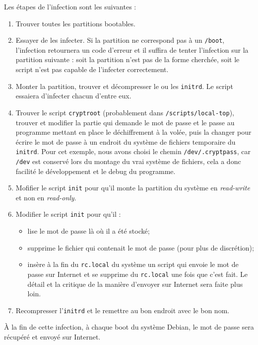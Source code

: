 \documentclass[12pt,a4paper]{article}
\begin{document}
Les étapes de l'infection sont les suivantes :
\begin{enumerate}
    \item Trouver toutes les partitions bootables.
    \item Essayer de les infecter. Si la partition ne correspond pas à un \texttt{/boot},
    l'infection retournera un code d'erreur et il suffira de tenter l'infection
    sur la partition suivante : soit la partition n'est pas de la forme cherchée,
    soit le script n'est pas capable de l'infecter correctement.
    \item Monter la partition, trouver et décompresser le ou les \texttt{initrd}. Le
    script essaiera d'infecter chacun d'entre eux.
    \item Trouver le script \texttt{cryptroot} (probablement dans
    \texttt{/scripts/local-top}), trouver et modifier la partie qui demande le
    mot de passe et le passe au programme mettant en place le déchiffrement à la
    volée, puis la changer pour écrire le mot de passe à un endroit du système
    de fichiers temporaire du \texttt{initrd}. Pour cet exemple, nous avons choisi le chemin
    \texttt{/dev/.cryptpass}, car \texttt{/dev} est conservé lors du montage
    du vrai système de fichiers, cela a donc facilité le développement et le
    debug du programme.
    \item Mofifier le script \texttt{init} pour qu'il monte la partition du
    système en \textit{read-write} et non en \textit{read-only}.
    \item Modifier le script \texttt{init} pour qu'il :
    \begin{itemize}
        \item lise le mot de passe là où il a été stocké;
        \item supprime le fichier qui contenait le mot de passe (pour plus de 
        discrétion);
        \item insère à la fin du \texttt{rc.local} du système un script qui envoie le mot
        de passe sur Internet et se supprime du \texttt{rc.local} une fois que c'est fait.
        Le détail et la critique de la manière d'envoyer sur Internet sera faite
        plus loin.
    \end{itemize}
    \item Recompresser l'\texttt{initrd} et le remettre au bon endroit avec le bon nom.
\end{enumerate}

À la fin de cette infection, à chaque boot du système Debian, le mot de passe sera
récupéré et envoyé sur Internet.
\end{document}
